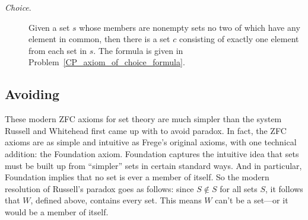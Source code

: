 \begin{description}
\item[\emph{Choice}.]  Given a
  set $s$ whose members are nonempty sets no two of which have any
  element in common, then there is a set $c$ consisting of exactly
  one element from each set in $s$.  The formula is given in
  Problem~\ref{CP_axiom_of_choice_formula}.

\iffalse

\begin{tabbing}
$\exists y \, \forall z \, \forall w \,
 \biggl( ($\=$z \in w \,\QAND\, w \in x) \; \QIMPLIES $\\
\> $\exists v \, \exists u \, \Bigl(\exists t \, \bigr((u \in w \, \QAND \, w \in t)$\=$\;\QAND\; (u \in t \,\QAND\, t \in y)\bigl) $\\
\> \> $\QIFF\; u = v\Bigr) \biggr)$
\end{tabbing}

\[\begin{array}{rlll}
\exists y \forall z \forall w & ( (z \in w \QAND w \in x) \QIMPLIES\\
                              &\quad \exists v \exists u (\exists t
                                           ((u \in w \QAND & w \in t)
                                                              & \QAND (u \in t \QAND t \in y))\\
                                                            &&& \QIFF u = v))
\end{array}\]

\fi
\end{description}

\subsection{Avoiding }

These modern ZFC axioms for set theory are much simpler than the system
Russell and Whitehead first came up with to avoid paradox.  In fact, the
ZFC axioms are as simple and intuitive as Frege's original axioms, with
one technical addition: the Foundation axiom.  Foundation captures the
intuitive idea that sets must be built up from ``simpler'' sets in certain
standard ways.  And in particular, Foundation implies that no set is ever
a member of itself.  So the modern resolution of Russell's paradox goes as
follows: since $S \not \in S$ for all sets $S$, it follows that $W$,
defined above, contains every set.  This means $W$ can't be a set---or it
would be a member of itself.

